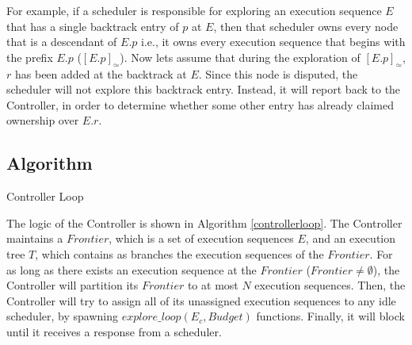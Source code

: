 For example, if a scheduler is responsible
for exploring an execution sequence $E$ that has a single backtrack 
entry of $p$ at $E$, then that scheduler owns every node
that is a descendant of $E.p$ i.e., it owns every execution sequence
that begins with the prefix $E.p$ ($[E.p]_\simeq$). Now lets assume that during the exploration of  $[E.p]_\simeq$, $r$ has been added at
the backtrack at $E$. Since this node is disputed, the scheduler
will not explore this backtrack entry. Instead, it will report
back to the Controller, in order to determine whether some other entry
has already claimed ownership over $E.r$. 


\subsection{Algorithm}

\begin{algorithm}
    \caption{Controller Loop}
    \label{controllerloop}

\end{algorithm}

The logic of the Controller is shown in Algorithm \ref{controllerloop}. The Controller maintains a $Frontier$, 
which is a set of execution sequences $E$, and an execution tree $T$, which contains
as branches the execution sequences of the $Frontier$. For as long as there exists an execution sequence at the $Frontier$ 
($Frontier \neq \emptyset$), the Controller will partition its $Frontier$ to at most $N$ execution sequences. Then, the Controller
will try to assign all of its unassigned execution sequences to any idle scheduler, by spawning $explore\_loop(E_c, Budget)$
functions. Finally, it will block until it receives a response from a scheduler.


